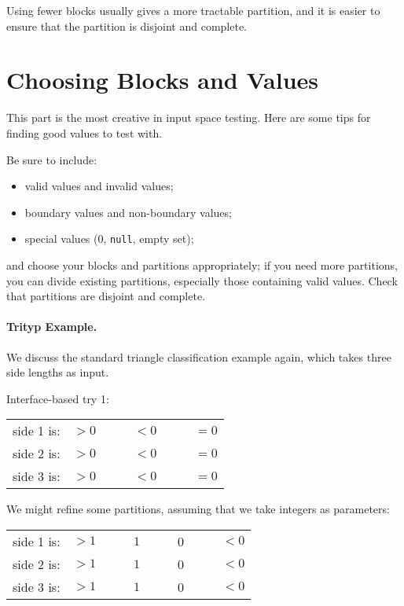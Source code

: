 \documentclass[11pt]{article}
\begin{document}
Using fewer blocks usually gives a more tractable partition, and
it is easier to ensure that the partition is disjoint and complete.

\section*{Choosing Blocks and Values}
This part is the most creative in input space testing. Here are some tips
for finding good values to test with. 

Be sure to include:
\begin{itemize}
\item valid values and invalid values;
\item boundary values and non-boundary values;
\item special values (0, {\tt null}, empty set);
\end{itemize}
and choose your blocks and partitions appropriately; if you need more
partitions, you can divide existing partitions, especially those containing
valid values. Check that partitions are disjoint and complete.

\paragraph{Trityp Example.} We discuss the standard triangle classification
example again, which takes three side lengths as input.

Interface-based try 1:

\begin{center}
\begin{tabular}{lccc}
side 1 is: & $ > 0$ & $\qquad < 0$ & $\qquad= 0$ \\
side 2 is: & $ > 0$ & $\qquad < 0$ & $\qquad= 0$ \\
side 3 is: & $ > 0$ & $\qquad < 0$ & $\qquad= 0$ \\
\end{tabular}
\end{center}

We might refine some partitions, assuming that we take integers as parameters:

\begin{center}
\begin{tabular}{lcccc}
side 1 is: & $ > 1$ & $\qquad 1 \qquad$ & 0 & $\qquad < 0$ \\
side 2 is: & $ > 1$ & $\qquad 1 \qquad$ & 0 & $\qquad < 0$ \\
side 3 is: & $ > 1$ & $\qquad 1 \qquad$ & 0 & $\qquad < 0$ \\
\end{tabular}
\end{center}
\end{document}
